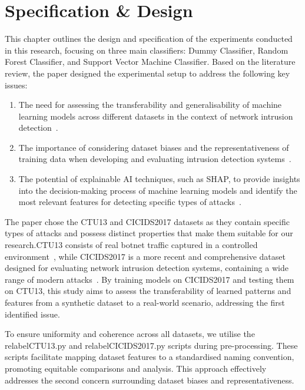 \chapter{Specification \& Design}

This chapter outlines the design and specification of the experiments conducted in this research, focusing on three main classifiers: Dummy Classifier, Random Forest Classifier, and Support Vector Machine Classifier. Based on the literature review, the paper designed the experimental setup to address the following key issues:

\begin{enumerate}
\item The need for assessing the transferability and generalisability of machine learning models across different datasets in the context of network intrusion detection~\cite{sommer2010outside, buczak2015survey}.
\item The importance of considering dataset biases and the representativeness of training data when developing and evaluating intrusion detection systems~\cite{sommer2010outside, engelen2021troubleshooting}.
\item The potential of explainable AI techniques, such as SHAP, to provide insights into the decision-making process of machine learning models and identify the most relevant features for detecting specific types of attacks~\cite{warnecke2020evaluating, amarasinghe2018toward, mane2021explaining}.
\end{enumerate}

The paper chose the CTU13 and CICIDS2017 datasets as they contain specific types of attacks and possess distinct properties that make them suitable for our research.CTU13 consists of real botnet traffic captured in a controlled environment~\cite{garcia2014empirical}, while CICIDS2017 is a more recent and comprehensive dataset designed for evaluating network intrusion detection systems, containing a wide range of modern attacks~\cite{sharafaldin2018toward}. By training models on CICIDS2017 and testing them on CTU13, this study aims to assess the transferability of learned patterns and features from a synthetic dataset to a real-world scenario, addressing the first identified issue.

To ensure uniformity and coherence across all datasets, we utilise the relabelCTU13.py and relabelCICIDS2017.py scripts during pre-processing. These scripts facilitate mapping dataset features to a standardised naming convention, promoting equitable comparisons and analysis. This approach effectively addresses the second concern surrounding dataset biases and representativeness.

